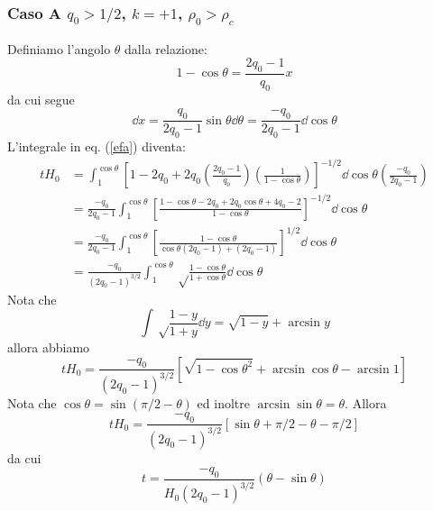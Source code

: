 \subsubsection{Caso A $q_0 > 1/2$, $k=+1$, $\rho_0> \rho_c$}

Definiamo l'angolo $\theta$ dalla relazione:
\begin{equation}
  1-\cos \theta = \frac{2q_0-1 }{q_0} x
  \label{posizioneiniziale}
\end{equation}
da cui segue
\begin{equation}
  \dd x = \frac {q_0}{2q_0-1} \sin \theta \dd \theta =  \frac{- q_0}{2q_0-1} \dd \cos \theta
\end{equation}
L'integrale in eq. (\ref{efa}) diventa:
\begin{equation}
  \begin{split}
    t H_0 &= \int _1^{\cos \theta} \left[1-2q_0+2q_0 \left(\frac{2q_0-1}{q_0}
      \right) \left(\frac{1}{1-\cos \theta} \right) \right]^{-1/2} \dd\cos\theta
    \left(\frac{-q_0}{2q_0-1} \right) \\
    &=\frac{-q_0}{2q_0-1} \int _1^{\cos \theta} \left[
      \frac{1-\cos \theta - 2q_0 + 2q_0 \cos \theta + 4q_0 -2} {1-\cos\theta}
    \right]^{-1/2} \dd\cos\theta \\
    &=\frac {-q_0}{2q_0-1} \int _1^{\cos \theta} \left[ \frac {1-\cos \theta}
      {\cos \theta (2q_0-1) + (2q_0-1)} \right]^{1/2} \dd\cos\theta \\
    &=\frac {-q_0}{(2q_0-1)^{3/2}} \int_1^{\cos \theta} \sqrt \frac
    {1-\cos \theta} {1+\cos \theta} \dd \cos \theta
  \end{split}
\end{equation}
Nota che
\begin{equation}
  \int \sqrt \frac {1-y}{1+y} \dd y = \sqrt {1-y} + \arcsin y
\end{equation}
allora abbiamo
\begin{equation}
  t H_0 = \frac {-q_0}{(2q_0-1)^{3/2}}
  \left[ \sqrt {1-\cos\theta^2} + \arcsin \cos \theta - \arcsin 1 \right]
\end{equation}
Nota che $\cos \theta = \sin (\pi/2-\theta)$ ed inoltre
$\arcsin \sin \theta = \theta$. Allora
\begin{equation}
  t H_0= \frac {-q_0}{(2q_0-1)^{3/2}} \left[ \sin \theta + {\pi}/{2} - \theta -
    {\pi}/{2}\right]
\end{equation}
da cui
\begin{equation}
  t = \frac {-q_0}{H_0(2q_0-1)^{3/2}} ( \theta - \sin \theta )
  \label{sema}
\end{equation}
